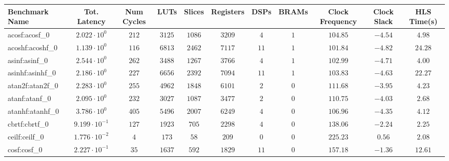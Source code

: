 \begin{tabular}{|l|c|c|c|c|c|c|c|c|c|c|}
\hline
Benchmark Name               & Tot. Latency            & Num Cycles & LUTs       & Slices    & Registers  & DSPs    & BRAMs & Clock Frequency & Clock Slack & HLS Time(s) \\
\hline
acosf:acosf\_0               & $ 2.022 \cdot 10^{0}  $ & $ 212    $ & $ 3125   $ & $ 1086  $ & $ 3209   $ & $ 4   $ & $ 1 $ & $ 104.85      $ & $ -4.54   $ & $ 4.98    $ \\
acoshf:acoshf\_0             & $ 1.139 \cdot 10^{0}  $ & $ 116    $ & $ 6813   $ & $ 2462  $ & $ 7117   $ & $ 11  $ & $ 1 $ & $ 101.84      $ & $ -4.82   $ & $ 24.28   $ \\
asinf:asinf\_0               & $ 2.544 \cdot 10^{0}  $ & $ 262    $ & $ 3488   $ & $ 1267  $ & $ 3766   $ & $ 4   $ & $ 1 $ & $ 102.99      $ & $ -4.71   $ & $ 4.00    $ \\
asinhf:asinhf\_0             & $ 2.186 \cdot 10^{0}  $ & $ 227    $ & $ 6656   $ & $ 2392  $ & $ 7094   $ & $ 11  $ & $ 1 $ & $ 103.83      $ & $ -4.63   $ & $ 22.27   $ \\
atan2f:atan2f\_0             & $ 2.283 \cdot 10^{0}  $ & $ 255    $ & $ 4962   $ & $ 1848  $ & $ 6101   $ & $ 2   $ & $ 0 $ & $ 111.68      $ & $ -3.95   $ & $ 4.23    $ \\
atanf:atanf\_0               & $ 2.095 \cdot 10^{0}  $ & $ 232    $ & $ 3027   $ & $ 1087  $ & $ 3477   $ & $ 2   $ & $ 0 $ & $ 110.75      $ & $ -4.03   $ & $ 2.68    $ \\
atanhf:atanhf\_0             & $ 3.786 \cdot 10^{0}  $ & $ 405    $ & $ 5496   $ & $ 2007  $ & $ 6249   $ & $ 4   $ & $ 0 $ & $ 106.96      $ & $ -4.35   $ & $ 4.12    $ \\
cbrtf:cbrtf\_0               & $ 9.199 \cdot 10^{-1} $ & $ 127    $ & $ 1923   $ & $ 705   $ & $ 2298   $ & $ 4   $ & $ 0 $ & $ 138.06      $ & $ -2.24   $ & $ 2.25    $ \\
ceilf:ceilf\_0               & $ 1.776 \cdot 10^{-2} $ & $ 4      $ & $ 173    $ & $ 58    $ & $ 209    $ & $ 0   $ & $ 0 $ & $ 225.23      $ & $ 0.56    $ & $ 2.08    $ \\
cosf:cosf\_0                 & $ 2.227 \cdot 10^{-1} $ & $ 35     $ & $ 1637   $ & $ 592   $ & $ 1829   $ & $ 11  $ & $ 0 $ & $ 157.18      $ & $ -1.36   $ & $ 12.61   $ \\

\end{tabular}

